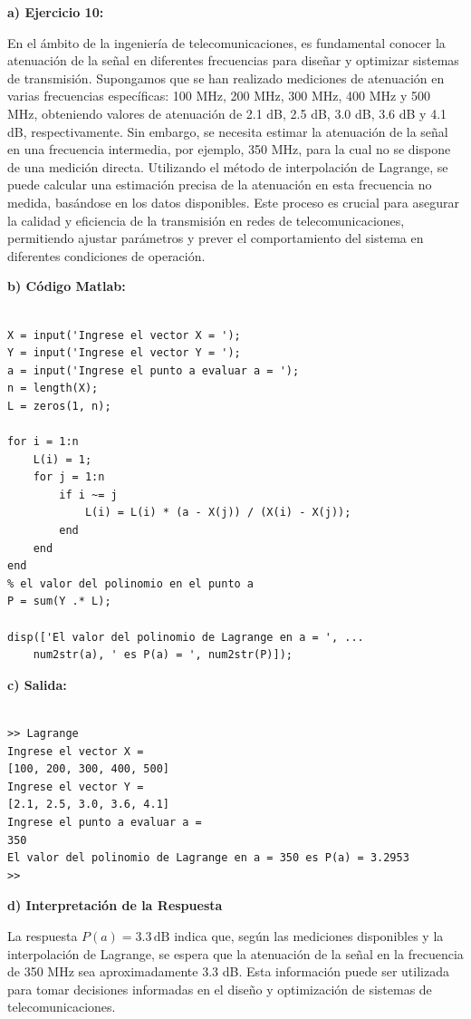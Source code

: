 \documentclass[12pt,a4paper,twoside]{article}  %
\begin{document}
\textbf{a) Ejercicio 10: }

En el ámbito de la ingeniería de telecomunicaciones, es fundamental conocer la atenuación de la señal en diferentes frecuencias para diseñar y optimizar sistemas de transmisión. Supongamos que se han realizado mediciones de atenuación en varias frecuencias específicas: 100 MHz, 200 MHz, 300 MHz, 400 MHz y 500 MHz, obteniendo valores de atenuación de 2.1 dB, 2.5 dB, 3.0 dB, 3.6 dB y 4.1 dB, respectivamente. Sin embargo, se necesita estimar la atenuación de la señal en una frecuencia intermedia, por ejemplo, 350 MHz, para la cual no se dispone de una medición directa. Utilizando el método de interpolación de Lagrange, se puede calcular una estimación precisa de la atenuación en esta frecuencia no medida, basándose en los datos disponibles. Este proceso es crucial para asegurar la calidad y eficiencia de la transmisión en redes de telecomunicaciones, permitiendo ajustar parámetros y prever el comportamiento del sistema en diferentes condiciones de operación.


\textbf{b) Código Matlab:}

\begin{lstlisting}

X = input('Ingrese el vector X = ');
Y = input('Ingrese el vector Y = ');
a = input('Ingrese el punto a evaluar a = ');
n = length(X);
L = zeros(1, n);

for i = 1:n
    L(i) = 1;
    for j = 1:n
        if i ~= j
            L(i) = L(i) * (a - X(j)) / (X(i) - X(j));
        end
    end
end
% el valor del polinomio en el punto a
P = sum(Y .* L);

disp(['El valor del polinomio de Lagrange en a = ', ...
    num2str(a), ' es P(a) = ', num2str(P)]);

\end{lstlisting}

\textbf{c) Salida:}

\begin{verbatim}

>> Lagrange
Ingrese el vector X = 
[100, 200, 300, 400, 500]
Ingrese el vector Y = 
[2.1, 2.5, 3.0, 3.6, 4.1]
Ingrese el punto a evaluar a = 
350
El valor del polinomio de Lagrange en a = 350 es P(a) = 3.2953
>> 

\end{verbatim}
\textbf{d) Interpretación de la Respuesta}

La respuesta \(P(a) = 3.3 \, \text{dB}\) indica que, según las mediciones disponibles y la interpolación de Lagrange, se espera que la atenuación de la señal en la frecuencia de 350 MHz sea aproximadamente 3.3 dB. Esta información puede ser utilizada para tomar decisiones informadas en el diseño y optimización de sistemas de telecomunicaciones.
\end{document}
